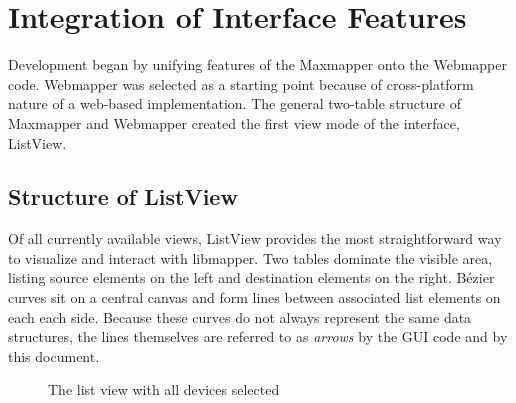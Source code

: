 
\section{Integration of Interface Features} %
\label{sec:integration_of_interface_features}

Development began by unifying features of the Maxmapper onto the Webmapper code. Webmapper was selected as a starting point because of cross-platform nature of a web-based implementation. The general two-table structure of Maxmapper and Webmapper created the first view mode of the interface, ListView.

	\subsection{Structure of ListView} %
	\label{sub:ListView}

Of all currently available views, ListView provides the most straightforward way to visualize and interact with libmapper. Two tables dominate the visible area, listing source elements on the left and destination elements on the right. B\'ezier curves sit on a central canvas and form lines between associated list elements on each each side. Because these curves do not always represent the same data structures, the lines themselves are referred to as \emph{arrows} by the GUI code and by this document.

\begin{figure}[ht]
\centering
\caption{The list view with all devices selected}
\label{fig:list_view_all_devices}
\end{figure}

